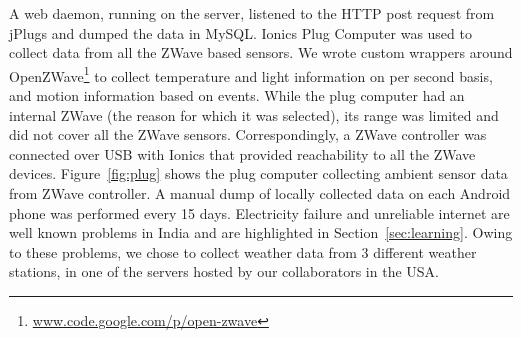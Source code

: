 \documentclass[10pt]{sensys-proc}
\newcommand{\figref}[1]{Figure~\ref{#1}}
\newcommand{\secref}[1]{Section~\ref{#1}}
\newcommand{\paradigm}{Sense-Local Store-Upload}
\begin{document}
A web daemon, running on the server, listened to the HTTP post request from jPlugs and dumped the data in MySQL. Ionics Plug Computer was used to collect data from all the ZWave based sensors. We wrote custom wrappers around OpenZWave\footnote{\url{www.code.google.com/p/open-zwave}} to collect temperature and light information on per second basis, and motion information based on events. While the plug computer had an internal ZWave (the reason for which it was selected), its range was limited and did not cover all the ZWave sensors. Correspondingly, a ZWave controller was connected over USB with Ionics that provided reachability to all the ZWave devices. %
\figref{fig:plug} shows the plug computer collecting ambient sensor data from ZWave controller. A manual dump of locally collected data on each Android phone was performed every 15 days. Electricity failure and unreliable internet are well known problems in India and are highlighted in \secref{sec:learning}. Owing to these problems, we chose to collect weather data from 3 different weather stations, in one of the servers hosted by our collaborators in the USA. 




\end{document}
